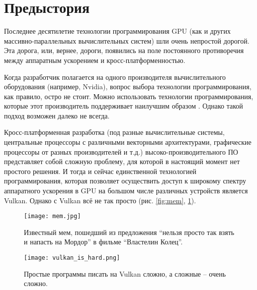 \documentclass[11pt,fleqn,english,russian]{report} %
\begin{document}
\section{Предыстория}

Последнее десятилетие технологии программирования GPU (как и других массивно-параллельных вычислительных систем) шли очень непростой дорогой. Эта дорога, или, вернее, дороги, появились на поле постоянного противоречия между аппаратным ускорением и кросс-платформенностью. 

Когда разработчик полагается на одного производителя вычислительного оборудования (например, Nvidia), вопрос выбора технологии программирования, как правило, остро не стоит. Можно использовать технологии программирования, которые этот производитель поддерживает наилучшим образом \cite{NVCPP,CUDA,OpenACC}. Однако такой подход возможен далеко не всегда. 

Кросс-платформенная разработка (под разные вычислительные системы, центральные процессоры с различными векторными архитектурами, графические процессоры от разных производителей и т.д.)  высоко-производительного ПО представляет собой сложную проблему, для которой в настоящий момент нет простого решения. И тогда и сейчас единственной технологией программирования, которая позволяет осуществить доступ к широкому спектру аппаратного ускорения в GPU на большом числе различных устройств является Vulkan. Однако с Vulkan всё не так просто (рис. \ref{fig:mem}, \ref{fig:vulkan_complexity}). 

\begin{figure}[h]
\begin{minipage}{0.45\textwidth}
	\centering
	\texttt{[image: mem.jpg]}
	\caption{Известный мем, пошедший из предложения ``нельзя просто так взять и напасть на Мордор'' в фильме ``Властелин Колец''.}
	\label{fig:mem}
\end{minipage}
\hfill
\begin{minipage}{0.45\textwidth}
	\centering
	\texttt{[image: vulkan\_is\_hard.png]}
	\caption{Простые программы писать на Vulkan сложно, а сложные -- очень сложно.}
	\label{fig:vulkan_complexity}
\end{minipage}
\end{figure}

\end{document}
